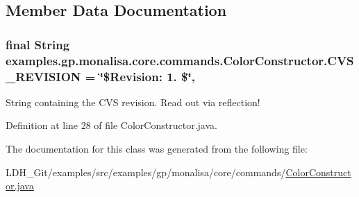 \subsection{Member Data Documentation}
\hypertarget{classexamples_1_1gp_1_1monalisa_1_1core_1_1commands_1_1_color_constructor_acc7472a767fcea41aad7df0481cff40b}{
\subsubsection[{C\-V\-S\-\_\-\-R\-E\-V\-I\-S\-I\-O\-N}]{\setlength{\rightskip}{0pt plus 5cm}final String examples.\-gp.\-monalisa.\-core.\-commands.\-Color\-Constructor.\-C\-V\-S\-\_\-\-R\-E\-V\-I\-S\-I\-O\-N = \char`\"{}\$Revision\-: 1. \$\char`\"{}\hspace{0.3cm}{\ttfamily [static]}, {\ttfamily [private]}}}\label{classexamples_1_1gp_1_1monalisa_1_1core_1_1commands_1_1_color_constructor_acc7472a767fcea41aad7df0481cff40b}
String containing the C\-V\-S revision. Read out via reflection! 

Definition at line 28 of file Color\-Constructor.\-java.



The documentation for this class was generated from the following file\-:\begin{DoxyCompactItemize}
\item 
L\-D\-H\-\_\-\-Git/examples/src/examples/gp/monalisa/core/commands/\hyperlink{_color_constructor_8java}{Color\-Constructor.\-java}\end{DoxyCompactItemize}
